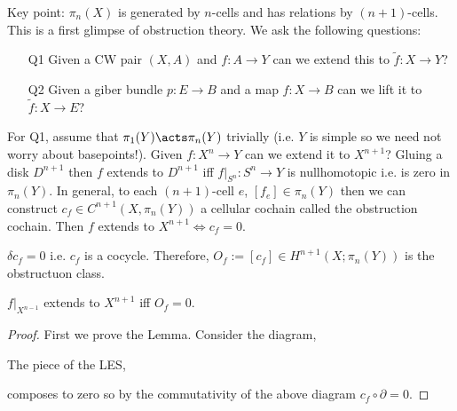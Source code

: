 \documentclass[12pt]{extarticle}
\begin{document}
\begin{remark}
Key point: $\pi_n(X)$ is generated by $n$-cells and has relations by $(n+1)$-cells. This is a first glimpse of obstruction theory. We ask the following questions:
\begin{enumerate}
\item[Q1] Given a CW pair $(X, A)$ and $f : A \to Y$ can we extend this to $\tilde{f} : X \to Y$?
\item[Q2] Given a giber bundle $p : E \to B$ and a map $f : X \to B$ can we lift it to $\tilde{f} : X \to E$?
\end{enumerate}
For Q1, assume that $\pi_1(Y) \acts \pi_n(Y)$ trivially (i.e. $Y$ is simple so we need not worry about basepoints!). Given $f : X^n \to Y$ can we extend it to $X^{n+1}$? Gluing a disk $D^{n+1}$ then $f$ extends to $D^{n+1}$ iff $f|_{S^n} : S^n \to Y$ is nullhomotopic i.e. is zero in $\pi_n(Y)$. In general, to each $(n + 1)$-cell $e$, $[f_e] \in \pi_n(Y)$ then we can construct $c_f \in C^{n+1}(X, \pi_n(Y))$ a cellular cochain called the obstruction cochain. Then $f$ extends to $X^{n+1} \iff c_f = 0$. 
\end{remark}

\begin{lemma}
$\delta c_f = 0$ i.e. $c_f$ is a cocycle. Therefore, $O_f := [c_f] \in H^{n+1}(X; \pi_n(Y))$ is the obstructuon class. 
\end{lemma}

\begin{theorem}
$f|_{X^{n-1}}$ extends to $X^{n+1}$ iff $O_f = 0$.  
\end{theorem}

\begin{proof}
First we prove the Lemma. Consider the diagram,
\begin{center}
\end{center}
The piece of the LES,
\begin{center}
\end{center}
composes to zero so by the commutativity of the above diagram $c_f \circ \partial = 0$. 
\end{proof}
\end{document}
